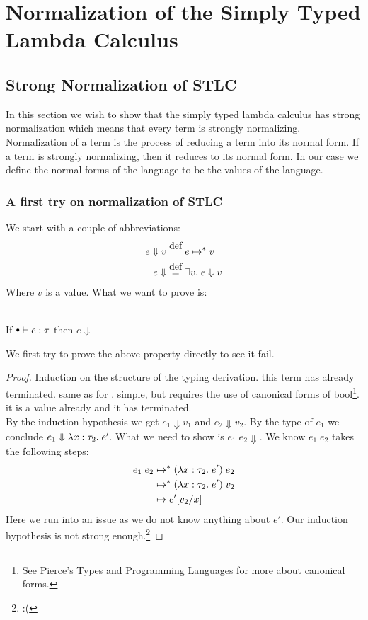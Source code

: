 \section*{Normalization of the Simply Typed Lambda Calculus}
\subsection*{Strong Normalization of STLC}
In this section we wish to show that the simply typed lambda calculus has strong normalization which means that every term is strongly normalizing. Normalization of a term is the process of reducing a term into its normal form. If a term is strongly normalizing, then it reduces to its normal form. In our case we define the normal forms of the language to be the values of the language.
\subsubsection*{A first try on normalization of STLC}
We start with a couple of abbreviations:
\begin{align*}
  e \Downarrow v & \eqdef e \evaltos v \\
  e \Downarrow   & \eqdef \exists v. \; e \Downarrow v
\end{align*}
Where $v$ is a value.
What we want to prove is:
\begin{strnorm}~\\
  If $\mtenv \vdash e : \tau$ then $e \Downarrow$
\end{strnorm}
We first try to prove the above property directly to see it fail.
\begin{proof} 
Induction on the structure of the typing derivation.
 this term has already terminated.
 same as for \true.
 simple, but requires the use of canonical forms of bool\footnote{See Pierce's Types and Programming Languages for more about canonical forms.}.
 it is a value already and it has terminated.
\case{$ \TApp $} \\
By the induction hypothesis we get $e_1 \Downarrow v_1$ and $e_2 \Downarrow v_2$. By the type of $e_1$ we conclude $e_1 \Downarrow \lambda x : \tau_2 . \; e'$. What we need to show is $e_1 \; e_2 \Downarrow$. We know $e_1 \; e_2$ takes the following steps:
\begin{align*}
  e_1 \; e_2 & \mapsto^{*} (\lambda x : \tau_2 . \; e') \; e_2 \\
            & \mapsto^{*} (\lambda x : \tau_2 . \; e') \; v_2 \\
            & \mapsto e'[v_2/x]
\end{align*}
Here we run into an issue as we do not know anything about $e'$. Our induction hypothesis is not strong enough.\footnote{:(}
\end{proof}

